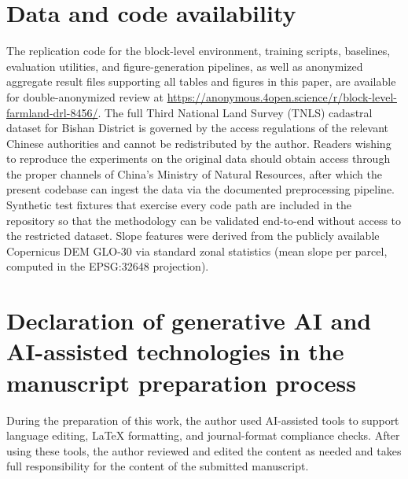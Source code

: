 \documentclass[preprint,12pt]{elsarticle}
\begin{document}
\section*{Data and code availability}
The replication code for the block-level environment, training scripts, baselines, evaluation utilities, and figure-generation pipelines, as well as anonymized aggregate result files supporting all tables and figures in this paper, are available for double-anonymized review at \url{https://anonymous.4open.science/r/block-level-farmland-drl-8456/}. The full Third National Land Survey (TNLS) cadastral dataset for Bishan District is governed by the access regulations of the relevant Chinese authorities and cannot be redistributed by the author. Readers wishing to reproduce the experiments on the original data should obtain access through the proper channels of China's Ministry of Natural Resources, after which the present codebase can ingest the data via the documented preprocessing pipeline. Synthetic test fixtures that exercise every code path are included in the repository so that the methodology can be validated end-to-end without access to the restricted dataset. Slope features were derived from the publicly available Copernicus DEM GLO-30 \citep{copernicus2021dem} via standard zonal statistics (mean slope per parcel, computed in the EPSG:32648 projection).

\section*{Declaration of generative AI and AI-assisted technologies in the manuscript preparation process}
During the preparation of this work, the author used AI-assisted tools to support language editing, LaTeX formatting, and journal-format compliance checks. After using these tools, the author reviewed and edited the content as needed and takes full responsibility for the content of the submitted manuscript.


\end{document}
